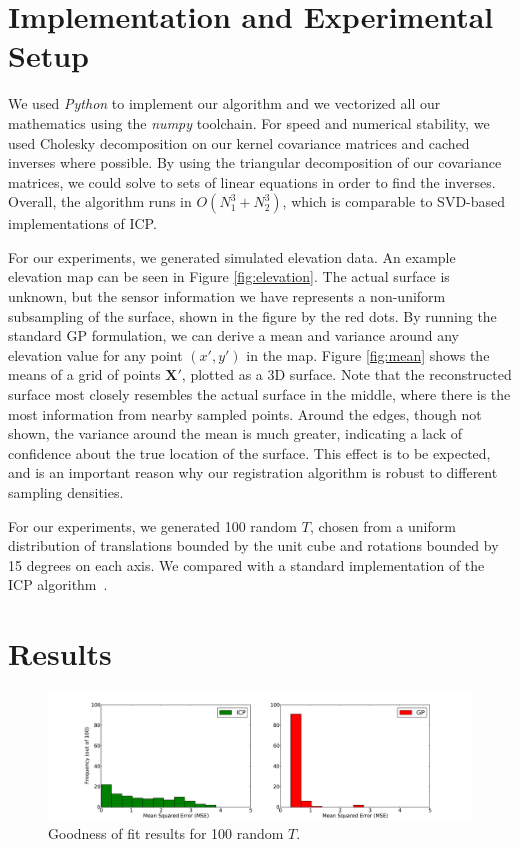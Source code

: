 \documentclass{article} %
\begin{document}
\section{Implementation and Experimental Setup}

We used \emph{Python} to implement our algorithm and we vectorized all our mathematics using the \emph{numpy} toolchain. For speed and numerical stability, we used Cholesky decomposition on our kernel covariance matrices and cached inverses where possible. By using the triangular decomposition of our covariance matrices, we could solve to sets of linear equations in order to find the inverses. Overall, the algorithm runs in $O(N_1^3 + N_2^3)$, which is comparable to SVD-based implementations of ICP.

For our experiments, we generated simulated elevation data. An example elevation map can be seen in Figure \ref{fig:elevation}. The actual surface is unknown, but the sensor information we have represents a non-uniform subsampling of the surface, shown in the figure by the red dots. By running the standard GP formulation, we can derive a mean and variance around any elevation value for any point $(x',y')$ in the map. Figure \ref{fig:mean} shows the means of a grid of points $\mathbf{X'}$, plotted as a 3D surface. Note that the reconstructed surface most closely resembles the actual surface in the middle, where there is the most information from nearby sampled points. Around the edges, though not shown, the variance around the mean is much greater, indicating a lack of confidence about the true location of the surface. This effect is to be expected, and is an important reason why our registration algorithm is robust to different sampling densities.

For our experiments, we generated 100 random $T$, chosen from a uniform distribution of translations bounded by the unit cube and rotations bounded by 15 degrees on each axis. We compared with a standard implementation of the ICP algorithm~\cite{besl_method_1992}. 


\section{Results}

\begin{figure}
\begin{center}
\includegraphics[width=5.7in]{goodnessoffit3.pdf}
\end{center}
\caption{Goodness of fit results for 100 random $T$.}
\label{fig:mse}
\end{figure}
\end{document}
